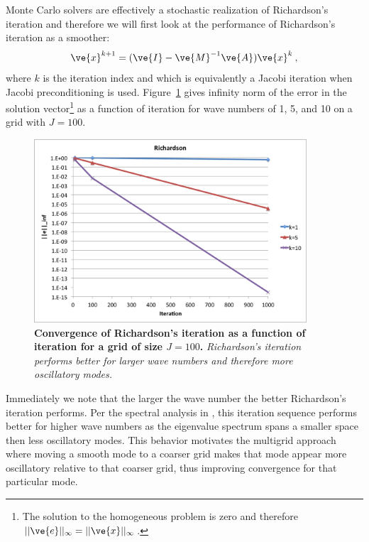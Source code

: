 \documentclass[note]{TechNote}
\begin{document}
Monte Carlo solvers are effectively a stochastic realization of
Richardson's iteration and therefore we will first look at the
performance of Richardson's iteration as a smoother:
\begin{equation}
  \ve{x}^{k+1} = (\ve{I}-\ve{M}^{-1}\ve{A})\ve{x}^k\:,
\end{equation}
where $k$ is the iteration index and which is equivalently a Jacobi
iteration when Jacobi preconditioning is
used. Figure~\ref{fig:richardson} gives infinity norm of the error in
the solution vector\footnote{The solution to the homogeneous problem is
  zero and therefore $||\ve{e}||_{\infty} = ||\ve{x}||_{\infty}$.} as
a function of iteration for wave numbers of 1, 5, and 10 on a grid
with $J = 100$.
\begin{figure}[h!]
  \begin{center}
    \includegraphics[width=4in]{richardson.png}
  \end{center}
  \caption{\textbf{Convergence of Richardson's iteration as a function
      of iteration for a grid of size $J = 100$.} \textit{Richardson's
      iteration performs better for larger wave numbers and therefore
      more oscillatory modes.}}
  \label{fig:richardson}
\end{figure}
Immediately we note that the larger the wave number the better
Richardson's iteration performs. Per the spectral analysis in
\cite{briggs_multigrid}, this iteration sequence performs better for
higher wave numbers as the eigenvalue spectrum spans a smaller space
then less oscillatory modes. This behavior motivates the multigrid
approach where moving a smooth mode to a coarser grid makes that mode
appear more oscillatory relative to that coarser grid, thus improving
convergence for that particular mode.
\end{document}
